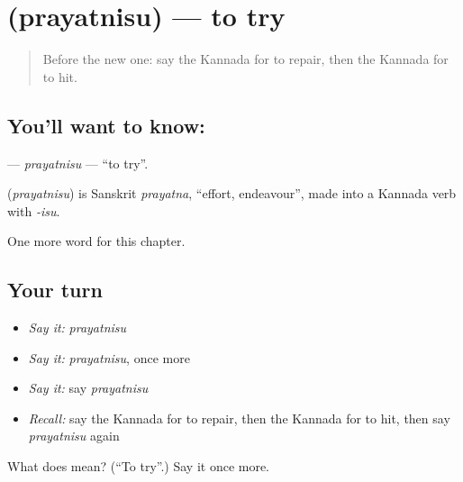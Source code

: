 \section[\texorpdfstring{\kn{ಪ್ರಯತ್ನಿಸು} (prayatnisu)}{ಪ್ರಯತ್ನಿಸು (prayatnisu)}]{ (prayatnisu) — to try}

\label{lesson:KA-C237-prayatnisu}



\begin{quote}
Before the new one: say the Kannada for to repair, then the Kannada for to hit.
\end{quote}

\subsection*{You'll want to know: }
\textbf{} — \emph{prayatnisu} — \textquotedblleft{}to try\textquotedblright{}.

\begin{cousinweb}
\textbf{} (\emph{prayatnisu}) is Sanskrit \emph{prayatna}, \textquotedblleft{}effort, endeavour\textquotedblright{}, made into a Kannada verb with \emph{-isu}.
\end{cousinweb}

\begin{grammarlens}[title={What you've built}]
One more word for this chapter.
\end{grammarlens}

\subsection*{Your turn}
\begin{itemize}
\raggedright
  \item \emph{Say it:} \emph{prayatnisu}
  \item \emph{Say it:} \emph{prayatnisu}, once more
  \item \emph{Say it:} say \emph{prayatnisu}
  \item \emph{Recall:} say the Kannada for to repair, then the Kannada for to hit, then say \emph{prayatnisu} again
\end{itemize}

\begin{tcolorbox}[breakable,colback=teal!4,colframe=teal!35!black,title={Before you move on}]
What does  mean? (\textquotedblleft{}To try\textquotedblright{}.) Say it once more.
\end{tcolorbox}
